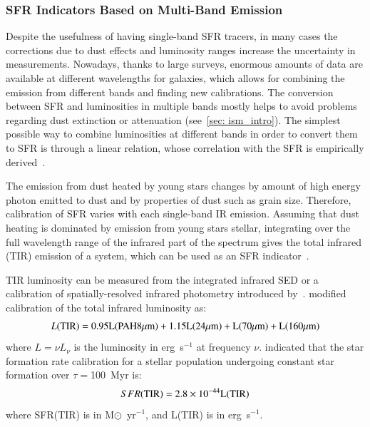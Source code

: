 \subsubsection*{SFR Indicators Based on Multi-Band Emission}

Despite the usefulness of having single-band SFR tracers, in many cases the corrections due to dust effects and luminosity ranges increase the uncertainty in measurements.
Nowadays, thanks to large surveys, enormous amounts of data are available at different wavelengths for galaxies, which allows for combining the emission from different bands and finding new calibrations.
The conversion between SFR and luminosities in multiple bands mostly helps to avoid problems regarding dust extinction or attenuation (see~\ref{sec: ism_intro}). 
The simplest possible way to combine luminosities at different bands in order to convert them to SFR is through a linear relation, whose correlation with the SFR is empirically derived~\citep{Kennicutt12}.

The emission from dust heated by young stars changes by amount of high energy photon emitted to dust and by properties of dust such as grain size.
Therefore, calibration of SFR varies with each single-band IR emission.
Assuming that dust heating is dominated by emission from young stars stellar, integrating over the full wavelength range of the infrared part of the spectrum gives the total infrared (TIR) emission of a system, which can be used as an SFR indicator~\citep{Kennicutt98b}. 
 
TIR luminosity can be measured from the integrated infrared SED or a calibration of spatially-resolved infrared photometry introduced by~\cite{Draine07}. 
\cite{Boquien10} modified calibration of the total infrared luminosity as: 
\begin{equation}
L(\rm TIR) = 0.95L(PAH 8 \mu m) + 1.15L(24 \mu m) + L(70 \mu m) + L(160 \mu m)
\end{equation}
where $L = \nu L_{\nu}$ is the luminosity in erg~s$^{-1}$ at frequency $\nu$. 
\cite{Calzetti07} indicated that the star formation rate calibration for a stellar population undergoing constant star formation over $\tau=$100~Myr is:
\begin{equation}
\label{sfr_tot_IR}
SFR(\rm TIR) = 2.8 \times10^{-44}L(\rm TIR)
\end{equation}
where SFR(TIR) is in M${\odot}$~yr$^{-1}$, and L(TIR) is in erg~s$^{-1}$. 


